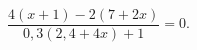 \begin{ex}[type=equation]
	\begin{condition}
		$\dfrac{4(x+ 1) -2(7+2x)}{0,3(2,4+4x) + 1} = 0.$
	\end{condition}
\end{ex}